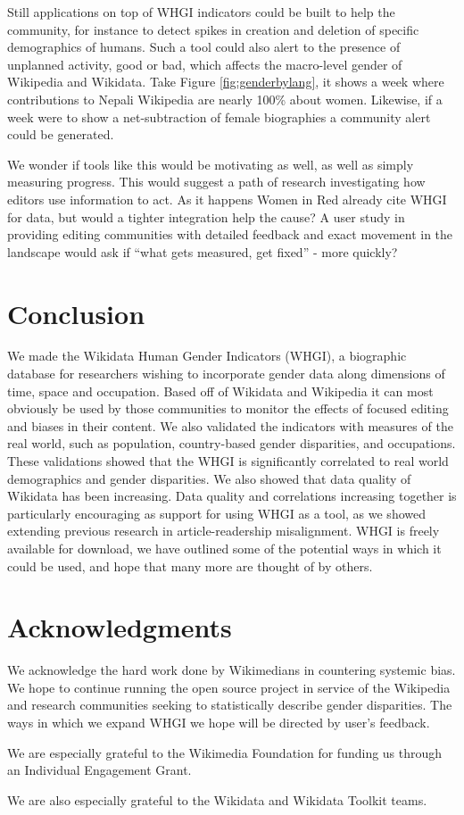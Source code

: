 \documentclass{sig-alternate-05-2015}
\begin{document}
Still applications on top of WHGI indicators could be built to help the community, for instance to detect spikes in creation and deletion of specific demographics of humans. Such a tool could also alert to the presence of unplanned activity, good or bad, which affects the macro-level gender of Wikipedia and Wikidata. Take Figure \ref{fig:genderbylang}, it shows a week where contributions to Nepali Wikipedia are nearly 100\% about women. Likewise, if a week were to show a net-subtraction of female biographies a community alert could be generated.

We wonder if tools like this would be motivating as well, as well as simply measuring progress. This would suggest a path of research investigating how editors use information to act. As it happens Women in Red already cite WHGI for data, but would a tighter integration help the cause? A user study in providing editing communities with detailed feedback and exact movement in the landscape would ask if ``what gets measured, get fixed'' - more quickly?
 

\section{Conclusion}
We made the Wikidata Human Gender Indicators (WHGI), a biographic database for researchers wishing to incorporate gender data along dimensions of time, space and occupation. Based off of Wikidata and Wikipedia it can most obviously be used by those communities to monitor the effects of focused editing and biases in their content. We also validated the indicators with measures of the real world, such as population, country-based gender disparities, and occupations. These validations showed that the WHGI is significantly correlated to real world demographics and gender disparities. We also showed that data quality of Wikidata has been increasing. Data quality and correlations increasing together is particularly encouraging as support for using WHGI as a tool, as we showed extending previous research in article-readership misalignment. WHGI is freely available for download, we have outlined some of the potential ways in which it could be used, and hope that many more are thought of by others.


\section{Acknowledgments}
We acknowledge the hard work done by Wikimedians in countering systemic bias. We hope to continue running the open source project in service of the Wikipedia and research communities seeking to statistically describe gender disparities. The ways in which we expand WHGI we hope will be directed by user's feedback.

We are especially grateful to the Wikimedia Foundation for funding us through an Individual Engagement Grant. 

We are also especially grateful to the Wikidata and Wikidata Toolkit teams.



%

\end{document}
